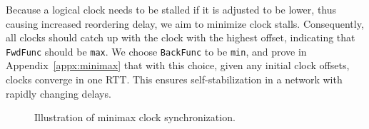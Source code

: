 Because a logical clock needs to be stalled if it is adjusted to be lower, thus causing increased reordering delay, we aim to minimize clock stalls.
Consequently, all clocks should catch up with the clock with the highest offset, indicating that \texttt{FwdFunc} should be \texttt{max}.
We choose \texttt{BackFunc} to be \texttt{min}, and prove in Appendix~\ref{appx:minimax} that with this choice, given any initial clock offsets, clocks converge in one RTT.
This ensures self-stabilization in a network with rapidly changing delays.

\iffalse
\begin{figure}[t]
\centering

\caption{Illustration of minimax clock synchronization.}
\label{fig:minimax}
\vspace{-1.2em}
\end{figure}

